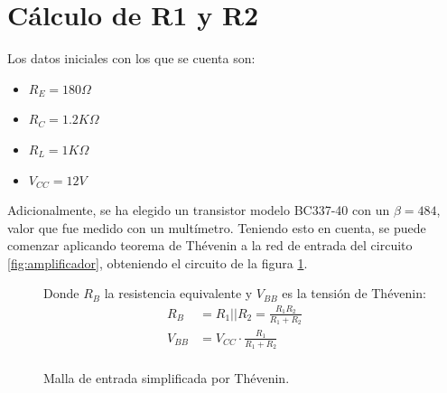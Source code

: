 \documentclass[chaptersright]{informeutn}
\begin{document}
\section{Cálculo de R1 y R2}
    Los datos iniciales con los que se cuenta son:
    \begin{itemize}
        \item $R_E = 180\Omega$
        \item $R_C = 1.2K\Omega$
        \item $R_L = 1K\Omega$
        \item $V_{CC} = 12V$
    \end{itemize}
    Adicionalmente, se ha elegido un transistor modelo BC337-40 con un $\beta = 484$, valor que fue medido con un
    multímetro.
    Teniendo esto en cuenta, se puede comenzar aplicando teorema de Thévenin a la red de entrada del circuito
    \ref{fig:amplificador}, obteniendo el circuito de la figura \ref{fig:malla-entrada}.
    
    \begin{figure}[!ht]
        \centering
        \begin{minipage}{0.4\textwidth}
            \centering
            \caption{Malla de entrada simplificada por Thévenin.}
            \label{fig:malla-entrada}
        \end{minipage}%
        \begin{minipage}{0.4\textwidth}
            \centering
            Donde $R_{B}$ la resistencia equivalente y $V_{BB}$ es la tensión de Thévenin:
            \begin{align*}
                R_{B} &= R_1||R_2=\frac{R_1 R_2}{R_1 + R_2} \\
                V_{BB} &= V_{CC} \cdot \frac{R_1}{R_1 + R_2} \\
            \end{align*}
        \end{minipage}
    \end{figure}
\end{document}
